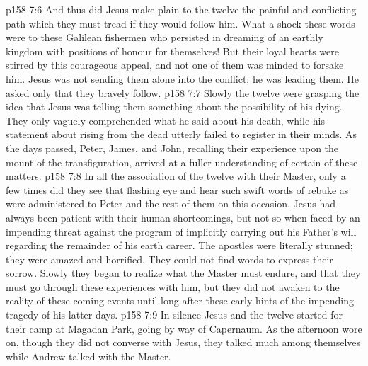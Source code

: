 \vs p158 7:6 And thus did Jesus make plain to the twelve the painful and conflicting path which they must tread if they would follow him. What a shock these words were to these Galilean fishermen who persisted in dreaming of an earthly kingdom with positions of honour for themselves! But their loyal hearts were stirred by this courageous appeal, and not one of them was minded to forsake him. Jesus was not sending them alone into the conflict; he was leading them. He asked only that they bravely follow.
\vs p158 7:7 Slowly the twelve were grasping the idea that Jesus was telling them something about the possibility of his dying. They only vaguely comprehended what he said about his death, while his statement about rising from the dead utterly failed to register in their minds. As the days passed, Peter, James, and John, recalling their experience upon the mount of the transfiguration, arrived at a fuller understanding of certain of these matters.
\vs p158 7:8 In all the association of the twelve with their Master, only a few times did they see that flashing eye and hear such swift words of rebuke as were administered to Peter and the rest of them on this occasion. Jesus had always been patient with their human shortcomings, but not so when faced by an impending threat against the program of implicitly carrying out his Father’s will regarding the remainder of his earth career. The apostles were literally stunned; they were amazed and horrified. They could not find words to express their sorrow. Slowly they began to realize what the Master must endure, and that they must go through these experiences with him, but they did not awaken to the reality of these coming events until long after these early hints of the impending tragedy of his latter days.
\vs p158 7:9 In silence Jesus and the twelve started for their camp at Magadan Park, going by way of Capernaum. As the afternoon wore on, though they did not converse with Jesus, they talked much among themselves while Andrew talked with the Master.
